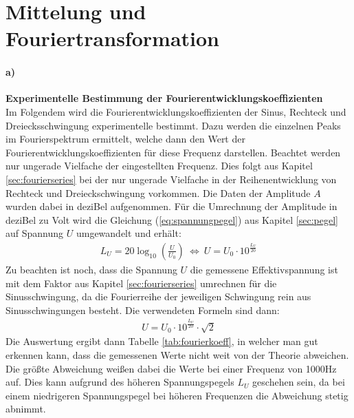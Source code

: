 
\section{Mittelung und Fouriertransformation}
\label{sec:mittelungAndTrafo}

\paragraph{a)}\textbf{Experimentelle Bestimmung der Fourierentwicklungskoeffizienten}\\
Im Folgendem wird die Fourierentwicklungskoeffizienten der Sinus, Rechteck und Dreiecksschwingung experimentelle bestimmt. Dazu werden die einzelnen Peaks im Fourierspektrum ermittelt, welche dann den Wert der Fourierentwicklungskoeffizienten für diese Frequenz darstellen. Beachtet werden nur ungerade Vielfache der eingestellten Frequenz. Dies folgt aus Kapitel \ref{sec:fourierseries} bei der nur ungerade Vielfache in der Reihenentwicklung von Rechteck und Dreieckschwingung vorkommen. Die Daten der Amplitude $A$ wurden dabei in deziBel aufgenommen. Für die Umrechnung der Amplitude in deziBel zu Volt wird die Gleichung (\ref{eq:spannungpegel}) aus Kapitel \ref{sec:pegel} auf Spannung $U$ umgewandelt und erhält:
\begin{gather}
    L_U = 20 \log_{10}\left(\frac{U}{U_0}\right)~\Leftrightarrow~U = U_0 \cdot 10^{\frac{L_U}{20}}
\end{gather}
Zu beachten ist noch, dass die Spannung $U$ die gemessene Effektivspannung ist mit dem Faktor aus Kapitel \ref{sec:fourierseries} umrechnen für die Sinusschwingung, da die Fourierreihe der jeweiligen Schwingung rein aus Sinusschwingungen besteht. Die verwendeten Formeln sind dann:
\begin{gather}
    U = U_0 \cdot 10^{\frac{L_U}{20}} \cdot \sqrt{2}    
    \label{eq:umrechnung}
\end{gather}
Die Auswertung ergibt dann Tabelle \ref{tab:fourierkoeff}, in welcher man gut erkennen kann, dass die gemessenen Werte nicht weit von der Theorie abweichen. Die größte Abweichung weißen dabei die Werte bei einer Frequenz von 1000Hz auf. Dies kann aufgrund des höheren Spannungspegels $L_U$ geschehen sein, da bei einem niedrigeren Spannungspegel bei höheren Frequenzen die Abweichung stetig abnimmt.
\newpage
